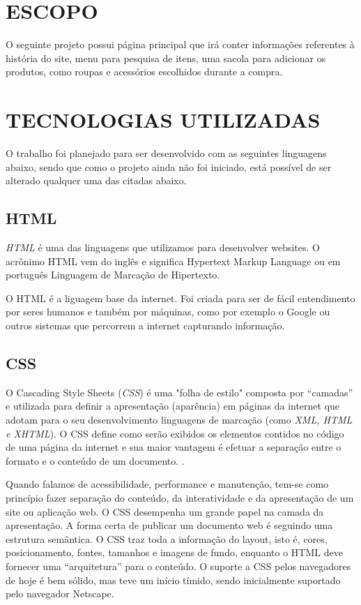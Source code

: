 \chapter{ESCOPO}
\label{chap:escopo}

O seguinte projeto possui página principal que irá conter informações referentes à história do site, menu para pesquisa de itens, uma sacola para adicionar os produtos, como roupas e acessórios escolhidos durante a compra.

\chapter{TECNOLOGIAS UTILIZADAS}
\label{chap:tec}

O trabalho foi planejado para ser desenvolvido com as seguintes linguagens abaixo, sendo que como o projeto ainda não foi iniciado, está possível de ser alterado qualquer uma das citadas abaixo.

\section{HTML}
 \textit{HTML} é uma das linguagens que utilizamos para desenvolver websites. O acrônimo HTML vem do inglês e significa Hypertext Markup Language ou em português Linguagem de Marcação de Hipertexto.

O HTML é a liguagem base da internet. Foi criada para ser de fácil entendimento por seres humanos e também por máquinas, como por exemplo o Google ou outros sistemas que percorrem a internet capturando informação.\cite{html}

\section{CSS}
O Cascading Style Sheets  (\textit{CSS}) é uma "folha de estilo" composta por “camadas” e utilizada para definir a apresentação (aparência) em páginas da internet que adotam para o seu desenvolvimento linguagens de marcação (como  \textit{XML, HTML e XHTML}). O CSS define como serão exibidos os elementos contidos no código de uma página da internet e sua maior vantagem é efetuar a separação entre o formato e o conteúdo de um documento. \cite{css1}.

Quando falamos de acessibilidade, performance e manutenção, tem-se como princípio fazer separação do conteúdo, da interatividade e da apresentação de um site ou aplicação web. O CSS desempenha um grande papel na camada da apresentação.
A forma certa de publicar um documento web é seguindo uma estrutura semântica. O CSS traz toda a informação do layout, isto é, cores, posicionamento, fontes, tamanhos e imagens de fundo, enquanto o HTML deve fornecer uma “arquitetura” para o conteúdo. O suporte a CSS pelos navegadores de hoje é bem sólido, mas teve um início tímido, sendo inicialmente suportado pelo navegador Netscape. \cite{css2}

